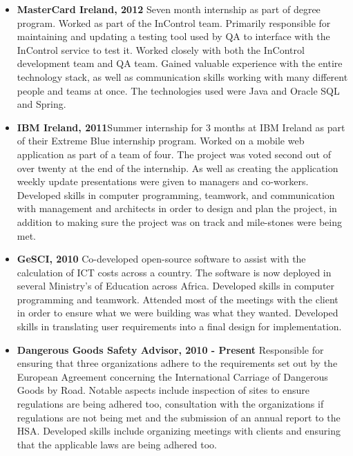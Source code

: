 \documentclass{res}
\begin{document}
\begin{resume}
\begin{itemize}
    \item{{\bf MasterCard Ireland, 2012}} Seven month internship as part of degree program. Worked as part of the InControl team. Primarily responsible for maintaining and updating a testing tool used by QA to interface with the InControl service to test it. Worked closely with both the InControl development team and QA team. Gained valuable experience with the entire technology stack, as well as communication skills working with many different people and teams at once. The technologies used were Java and Oracle SQL and Spring.\\
   
     
    \item{{\bf IBM Ireland, 2011}}Summer internship for 3 months at IBM Ireland as part of their Extreme Blue internship program. Worked on a mobile web application as part of a team of four. The project was voted second out of over twenty at the end of the internship. As well as creating the application weekly update presentations were given to managers and co-workers. Developed skills in computer programming, teamwork, and communication with management and architects in order to design and plan the project, in addition to making sure the project was on track and mile-stones were being met.\\
    
 
    \item{{\bf GeSCI, 2010}} Co-developed open-source software to assist with the calculation of ICT costs across a country. The software is now deployed in several Ministry's of Education across Africa. Developed skills in computer programming and teamwork. Attended most of the meetings with the client in order to ensure what we were building was what they wanted. Developed skills in translating user requirements into a final design for implementation.\\

    \item{{\bf Dangerous Goods Safety Advisor, 2010 - Present}} Responsible for ensuring that three organizations adhere to the requirements set out by the European Agreement concerning the International Carriage of Dangerous Goods by Road. Notable aspects include inspection of sites to ensure regulations are being adhered too, consultation with the organizations if regulations are not being met and the submission of an annual report to the HSA. Developed skills include organizing meetings with clients and ensuring that the applicable laws are being adhered too.\\
 

\end{itemize}
\end{resume}
\end{document}
